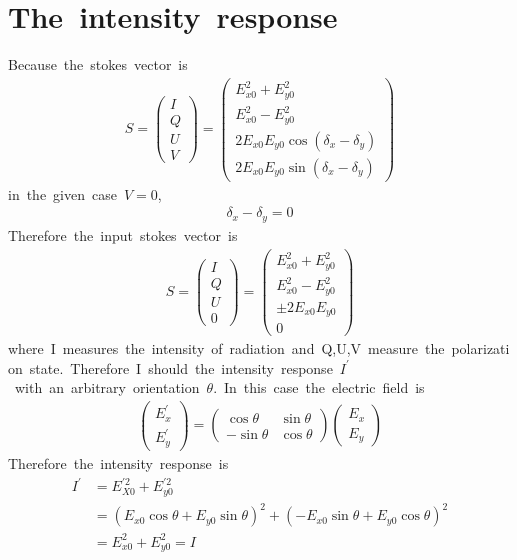 \section{The\ intensity\ response}
Because\ the\ stokes\ vector\ is
\begin{align*}
    S=\begin{pmatrix}
        I\\
        Q\\
        U\\
        V
    \end{pmatrix}=\begin{pmatrix}
        E^2_{x0}+E^2_{y0}\\
        E^2_{x0}-E^2_{y0}\\
        2E_{x0}E_{y0}\cos{(\delta_x-\delta_y)}\\
        2E_{x0}E_{y0}\sin{(\delta_x-\delta_y)}
    \end{pmatrix}
\end{align*}
in\ the\ given\ case\ $V=0$,
\begin{align*}
    \delta_x-\delta_y=0
\end{align*}
Therefore\ the\ input\ stokes\ vector\ is
\begin{align*}
    S=\begin{pmatrix}
        I\\
        Q\\
        U\\
        0
    \end{pmatrix}=\begin{pmatrix}
        E^2_{x0}+E^2_{y0}\\
        E^2_{x0}-E^2_{y0}\\
        \pm2E_{x0}E_{y0}\\
        0
    \end{pmatrix}
\end{align*}
where\ I\ measures\ the\ intensity\ of\ radiation\ and\ Q,U,V\ measure\ the\ polarization\ state.\ Therefore\ I\ should\ the\ intensity\ response\ $I^{\prime}$\ with\ an\ arbitrary\ orientation\ $\theta$.\ In\ this\ case\ the\ electric\ field\ is
\begin{align*}
    \begin{pmatrix}
        E_x^{\prime}\\
        E_y^{\prime}
    \end{pmatrix}=\begin{pmatrix}
        \cos{\theta}&\sin{\theta}\\
        -\sin{\theta}&\cos{\theta}
    \end{pmatrix}\begin{pmatrix}
        E_x\\
        E_y
    \end{pmatrix}
\end{align*}
Therefore\ the\ intensity\ response\ is
\begin{align}
    I^{\prime}&=E^{\prime2}_{X0}+E^{\prime2}_{y0}\nonumber\\
    &=(E_{x0}\cos\theta+E_{y0}\sin\theta)^2+(-E_{x0}\sin\theta+E_{y0}\cos\theta)^2\nonumber\\
    &=E^2_{x0}+E^2_{y0}=I
\end{align}

